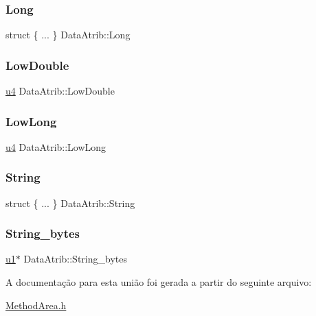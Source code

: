 \subsubsection{\texorpdfstring{Long}{Long}}
{\footnotesize\ttfamily struct \{ ... \}  Data\+Atrib\+::\+Long}

\mbox{\label{unionDataAtrib_a1f6e08d1c97fee36f6b0f92d7b985933}} 
\subsubsection{\texorpdfstring{Low\+Double}{LowDouble}}
{\footnotesize\ttfamily \hyperlink{ClassLoader_8h_aedf6ddc03df8caaaccbb4c60b9a9b850}{u4} Data\+Atrib\+::\+Low\+Double}

\mbox{\label{unionDataAtrib_abb7703b7239c1c10a4f0dd2564af85cf}} 
\subsubsection{\texorpdfstring{Low\+Long}{LowLong}}
{\footnotesize\ttfamily \hyperlink{ClassLoader_8h_aedf6ddc03df8caaaccbb4c60b9a9b850}{u4} Data\+Atrib\+::\+Low\+Long}

\mbox{\label{unionDataAtrib_a311ec052f39dc74b8fe8bedec2b94c7c}} 
\subsubsection{\texorpdfstring{String}{String}}
{\footnotesize\ttfamily struct \{ ... \}  Data\+Atrib\+::\+String}

\mbox{\label{unionDataAtrib_a6ed5174c66346d1713654b70b363eef7}} 
\subsubsection{\texorpdfstring{String\+\_\+bytes}{String\_bytes}}
{\footnotesize\ttfamily \hyperlink{ClassLoader_8h_a216a9f8b04b4f0af84a4ca9d1d85a6ca}{u1}$\ast$ Data\+Atrib\+::\+String\+\_\+bytes}



A documentação para esta união foi gerada a partir do seguinte arquivo\+:\begin{DoxyCompactItemize}
\item 
\hyperlink{MethodArea_8h}{Method\+Area.\+h}\end{DoxyCompactItemize}
